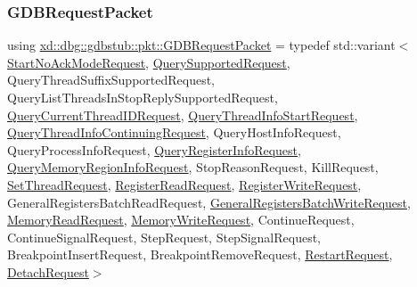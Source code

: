\subsubsection{\texorpdfstring{G\+D\+B\+Request\+Packet}{GDBRequestPacket}}
{\footnotesize\ttfamily using \mbox{\hyperlink{namespacexd_1_1dbg_1_1gdbstub_1_1pkt_a65690974f9b6e8807842c637042664a6}{xd\+::dbg\+::gdbstub\+::pkt\+::\+G\+D\+B\+Request\+Packet}} = typedef std\+::variant$<$ \mbox{\hyperlink{classxd_1_1dbg_1_1gdbstub_1_1pkt_1_1_start_no_ack_mode_request}{Start\+No\+Ack\+Mode\+Request}}, \mbox{\hyperlink{classxd_1_1dbg_1_1gdbstub_1_1pkt_1_1_query_supported_request}{Query\+Supported\+Request}}, Query\+Thread\+Suffix\+Supported\+Request, Query\+List\+Threads\+In\+Stop\+Reply\+Supported\+Request, \mbox{\hyperlink{classxd_1_1dbg_1_1gdbstub_1_1pkt_1_1_query_current_thread_i_d_request}{Query\+Current\+Thread\+I\+D\+Request}}, \mbox{\hyperlink{classxd_1_1dbg_1_1gdbstub_1_1pkt_1_1_query_thread_info_start_request}{Query\+Thread\+Info\+Start\+Request}}, \mbox{\hyperlink{classxd_1_1dbg_1_1gdbstub_1_1pkt_1_1_query_thread_info_continuing_request}{Query\+Thread\+Info\+Continuing\+Request}}, Query\+Host\+Info\+Request, Query\+Process\+Info\+Request, \mbox{\hyperlink{classxd_1_1dbg_1_1gdbstub_1_1pkt_1_1_query_register_info_request}{Query\+Register\+Info\+Request}}, \mbox{\hyperlink{classxd_1_1dbg_1_1gdbstub_1_1pkt_1_1_query_memory_region_info_request}{Query\+Memory\+Region\+Info\+Request}}, Stop\+Reason\+Request, Kill\+Request, \mbox{\hyperlink{classxd_1_1dbg_1_1gdbstub_1_1pkt_1_1_set_thread_request}{Set\+Thread\+Request}}, \mbox{\hyperlink{classxd_1_1dbg_1_1gdbstub_1_1pkt_1_1_register_read_request}{Register\+Read\+Request}}, \mbox{\hyperlink{classxd_1_1dbg_1_1gdbstub_1_1pkt_1_1_register_write_request}{Register\+Write\+Request}}, General\+Registers\+Batch\+Read\+Request, \mbox{\hyperlink{classxd_1_1dbg_1_1gdbstub_1_1pkt_1_1_general_registers_batch_write_request}{General\+Registers\+Batch\+Write\+Request}}, \mbox{\hyperlink{classxd_1_1dbg_1_1gdbstub_1_1pkt_1_1_memory_read_request}{Memory\+Read\+Request}}, \mbox{\hyperlink{classxd_1_1dbg_1_1gdbstub_1_1pkt_1_1_memory_write_request}{Memory\+Write\+Request}}, Continue\+Request, Continue\+Signal\+Request, Step\+Request, Step\+Signal\+Request, Breakpoint\+Insert\+Request, Breakpoint\+Remove\+Request, \mbox{\hyperlink{classxd_1_1dbg_1_1gdbstub_1_1pkt_1_1_restart_request}{Restart\+Request}}, \mbox{\hyperlink{classxd_1_1dbg_1_1gdbstub_1_1pkt_1_1_detach_request}{Detach\+Request}}$>$}



